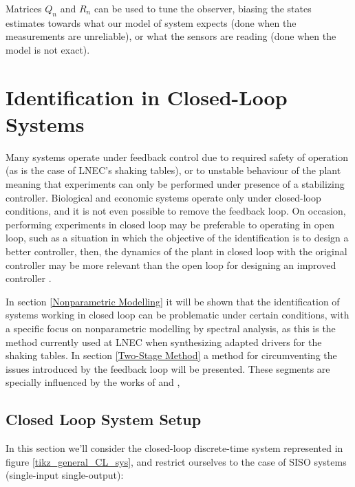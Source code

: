 \documentclass[  10pt, twoside]{report} %
\numberwithin{equation}{chapter}
\begin{document}
Matrices $Q_n$ and $R_n$ can be used to tune the observer, biasing the states estimates towards what our model of system expects (done when the measurements are unreliable), or what the sensors are reading (done when the model is not exact).

\section{Identification in Closed-Loop Systems} \label{Identification in Closed-Loop Systems}
Many systems operate under feedback control due to required safety of operation (as is the case of LNEC's shaking tables), or to unstable behaviour of the plant meaning that experiments can only be performed under presence of a stabilizing controller. Biological and economic systems operate only under closed-loop conditions, and it is not even possible to remove the feedback loop. On occasion, performing experiments in closed loop may be preferable to operating in open loop, such as a situation in which the objective of the identification is to design a better controller, then, the dynamics of the plant in closed loop with the original controller may be more relevant than the open loop for designing an improved controller \citep{VanDenHof2020}. 

In section \ref{Nonparametric Modelling} it will be shown that the identification of systems working in closed loop can be problematic under certain conditions, with a specific focus on nonparametric modelling by spectral analysis, as this is the method currently used at LNEC when synthesizing adapted drivers for the shaking tables. In section \ref{Two-Stage Method} a method for circumventing the issues introduced by the feedback loop will be presented. These segments are specially influenced by the works of \cite{VanDenHof2020} and \cite{Soderstrom_Stoica},

\subsection{ Closed Loop System Setup} %
In this section we'll consider the closed-loop discrete-time system represented in figure \ref{tikz_general_CL_sys}, and restrict ourselves to the case of SISO systems (single-input single-output):
\end{document}
